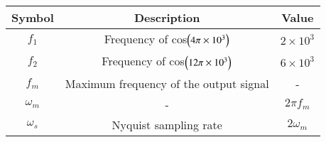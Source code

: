 \begin{tabular}{|c|c|c|}
    \hline
	Symbol &Description&Value \\
        \hline
	$f_1$&Frequency of cos$\left(4\pi\times10^3\right)$&$2\times10^3$ \\
        \hline
	$f_2$&Frequency of cos$\left(12\pi\times10^3\right)$&$6\times10^3$ \\
	\hline
	$f_m$&Maximum frequency of the output signal&- \\
	\hline
	 $\omega_{m}$&-&$2\pi f_m$ \\
         \hline
	 $\omega_{s}$&Nyquist sampling rate&$2\omega_m$ \\
         \hline
    \end{tabular}
